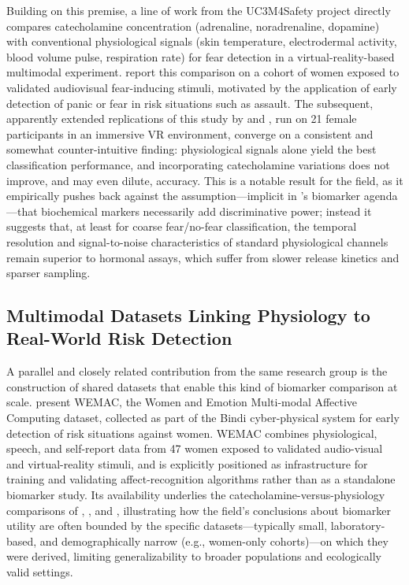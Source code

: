 Building on this premise, a line of work from the UC3M4Safety project directly compares catecholamine concentration (adrenaline, noradrenaline, dopamine) with conventional physiological signals (skin temperature, electrodermal activity, blood volume pulse, respiration rate) for fear detection in a virtual-reality-based multimodal experiment. \cite{gutierrezmartin2022fear} report this comparison on a cohort of women exposed to validated audiovisual fear-inducing stimuli, motivated by the application of early detection of panic or fear in risk situations such as assault. The subsequent, apparently extended replications of this study by \cite{qu2024advancing} and \cite{qu2024student}, run on 21 female participants in an immersive VR environment, converge on a consistent and somewhat counter-intuitive finding: physiological signals alone yield the best classification performance, and incorporating catecholamine variations does not improve, and may even dilute, accuracy. This is a notable result for the field, as it empirically pushes back against the assumption---implicit in \cite{zamkah2020identification}'s biomarker agenda---that biochemical markers necessarily add discriminative power; instead it suggests that, at least for coarse fear/no-fear classification, the temporal resolution and signal-to-noise characteristics of standard physiological channels remain superior to hormonal assays, which suffer from slower release kinetics and sparser sampling.

\subsection{Multimodal Datasets Linking Physiology to Real-World Risk Detection}
A parallel and closely related contribution from the same research group is the construction of shared datasets that enable this kind of biomarker comparison at scale. \cite{a2022wemac} present WEMAC, the Women and Emotion Multi-modal Affective Computing dataset, collected as part of the Bindi cyber-physical system for early detection of risk situations against women. WEMAC combines physiological, speech, and self-report data from 47 women exposed to validated audio-visual and virtual-reality stimuli, and is explicitly positioned as infrastructure for training and validating affect-recognition algorithms rather than as a standalone biomarker study. Its availability underlies the catecholamine-versus-physiology comparisons of \cite{gutierrezmartin2022fear}, \cite{qu2024advancing}, and \cite{qu2024student}, illustrating how the field's conclusions about biomarker utility are often bounded by the specific datasets---typically small, laboratory-based, and demographically narrow (e.g., women-only cohorts)---on which they were derived, limiting generalizability to broader populations and ecologically valid settings.

